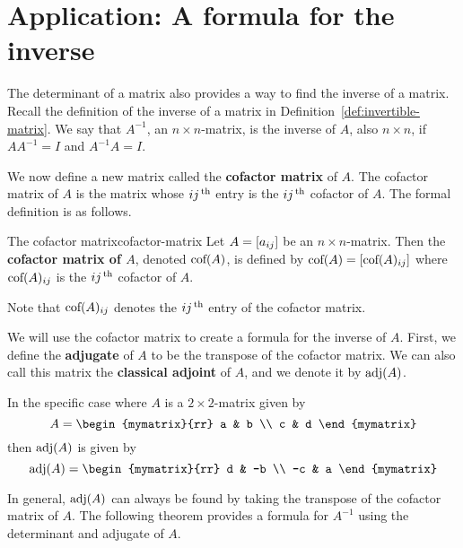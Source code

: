 \section{Application: A formula for the inverse}

The determinant of a matrix also provides a way to find the inverse of a matrix.
Recall the definition of the inverse of a matrix in Definition~\ref{def:invertible-matrix}.
We say that $A^{-1}$, an $n \times n$-matrix, is the inverse of $A$, also $n \times n$, if $AA^{-1} = I$ and $A^{-1}A=I$. 

We now define a new matrix called the \textbf{cofactor matrix} of $A$.  
The cofactor matrix of $A$ is the matrix whose $ij^{\,\rm th}$ entry is the $ij^{\,\rm th}$ cofactor of $A$.
The formal definition is as follows.

\begin{definition}{The cofactor matrix}{cofactor-matrix}
Let $A=\left[a_{ij}\right]$ be an $n\times n$-matrix. Then the
\textbf{cofactor matrix of $A$}, denoted 
$\mbox{\rm cof}(A)$, is defined by $\mbox{\rm cof}(A) =\left[
\mbox{\rm cof}(A)_{ij}\right] $ where  $\mbox{\rm cof}(A)_{ij}$ is the $ij^{\,\rm th}$ cofactor of $A$.
\end{definition}

Note that $\mbox{\rm cof}(A)_{ij}$ denotes the $ij^{\,\rm th}$ entry of the cofactor matrix.

We will use the cofactor matrix to create a formula for the inverse of $A$. First,
we define the \textbf{adjugate} of $A$ to be the transpose of 
the cofactor matrix. We can also call this matrix the \textbf{classical adjoint} of $A$,
and we denote it by $\mbox{\rm adj} (A)$. 

In the specific case where $A$ is a $2 \times 2$-matrix given by
\begin{equation*}
A = \begin{mymatrix}{rr}
a & b \\
c & d
\end{mymatrix}
\end{equation*}
then $\mbox{\rm adj}(A)$ is given by
\begin{equation*}
\func{adj}(A) = 
\begin{mymatrix}{rr}
d & -b \\
-c & a
\end{mymatrix}
\end{equation*}

In general, $\mbox{\rm adj}(A)$ can always be found by taking the transpose of the cofactor matrix of $A$. The following theorem provides a formula for $A^{-1}$ using the determinant and adjugate of $A$.

